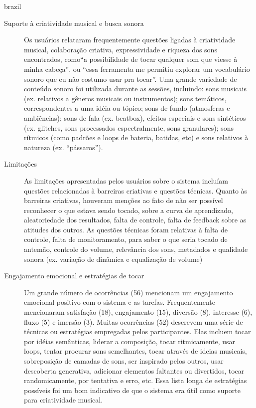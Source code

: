 \begin{otherlanguage*}{brazil}
\begin{description}
\item[Suporte à criatividade musical e busca sonora] Os usuários relataram frequentemente questões ligadas à criatividade musical, colaboração criativa, expressividade e riqueza dos sons encontrados, como``a possibilidade de tocar qualquer som que viesse à minha cabeça'', ou ``essa ferramenta me permitiu explorar um vocabulário sonoro que eu não costumo usar pra tocar''. Uma grande variedade de conteúdo sonoro foi utilizada durante as sessões, incluindo: sons musicais (ex. relativos a gêneros musicais ou instrumentos); sons temáticos, correspondentes a uma idéia ou tópico; sons de fundo (atmosferas e ambiências); sons de fala (ex. beatbox), efeitos especiais e sons sintéticos (ex. glitches, sons processados espectralmente, sons granulares); sons rítmicos (como padrões e loops de bateria, batidas, etc) e sons relativos à natureza (ex. ``pássaros'').

\item[Limitações] As limitações apresentadas pelos usuários sobre o sistema incluíam questões relacionadas à barreiras criativas e questões técnicas. Quanto às barreiras criativas, houveram menções ao fato de não ser possível reconhecer o que estava sendo tocado, sobre a curva de aprendizado, aleatoriedade dos resultados, falta de controle, falta de feedback sobre as atitudes dos outros. As questões técnicas foram relativas à falta de controle, falta de monitoramento, para saber o que seria tocado de antemão, controle do volume, relevância dos sons, metadados e qualidade sonora (ex. variação de dinâmica e equalização de volume)

\item[Engajamento emocional e estratégias de tocar] Um grande número de ocorrências (56) mencionam um engajamento emocional positivo com o sistema e as tarefas. Frequentemente mencionaram satisfação (18), engajamento (15), diversão (8), interesse (6), fluxo (5) e imersão (3). Muitas ocorrências (52) descrevem uma série de técnicas ou estratégias empregadas pelos participantes. Elas incluem tocar por idéias semânticas, liderar a composição, tocar ritmicamente, usar loops, tentar procurar sons semelhantes, tocar através de ideias musicais, sobreposição de camadas de sons, ser inspirado pelos outros, usar descoberta generativa, adicionar elementos faltantes ou divertidos, tocar randomicamente, por tentativa e erro, etc. Essa lista longa de estratégias possíveis foi um bom indicativo de que o sistema era útil como suporte para criatividade musical. 


\end{description}
\end{otherlanguage*}
